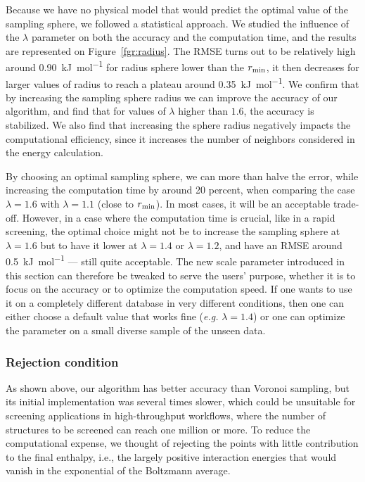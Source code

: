 \documentclass[main]{subfiles}
\begin{document}
Because we have no physical model that would predict the optimal value of the sampling sphere, we followed a statistical approach. We studied the influence of the $\lambda$ parameter on both the accuracy and the computation time, and the results are represented on Figure~\ref{fgr:radius}. The RMSE turns out to be relatively high around \SI{0.90}{\kilo\joule\per\mole} for radius sphere lower than the $r_{\text{min}}$, it then decreases for larger values of radius to reach a plateau around \SI{0.35}{\kilo\joule\per\mole}. We confirm that by increasing the sampling sphere radius we can improve the accuracy of our algorithm, and find that for values of $\lambda$ higher than $1.6$, the accuracy is stabilized. We also find that increasing the sphere radius negatively impacts the computational efficiency, since it increases the number of neighbors considered in the energy calculation.

By choosing an optimal sampling sphere, we can more than halve the error, while increasing the computation time by around 20 percent, when comparing the case $\lambda=1.6$ with $\lambda=1.1$ (close to $r_{\text{min}}$). In most cases, it will be an acceptable trade-off. However, in a case where the computation time is crucial, like in a rapid screening, the optimal choice might not be to increase the sampling sphere at $\lambda=1.6$ but to have it lower at $\lambda=1.4$ or $\lambda=1.2$, and have an RMSE around \SI{0.5}{\kilo\joule\per\mole} --- still quite acceptable. The new scale parameter introduced in this section can therefore be tweaked to serve the users' purpose, whether it is to focus on the accuracy or to optimize the computation speed. {If one wants to use it on a completely different database in very different conditions, then one can either choose a default value that works fine (\emph{e.g.} $\lambda=1.4$) or one can optimize the parameter on a small diverse sample of the unseen data. }

\subsubsection{Rejection condition}

As shown above, our algorithm has better accuracy than Voronoi sampling, but its initial implementation was several times slower, which could be unsuitable for screening applications in high-throughput workflows, where the number of structures to be screened can reach one million or more. To reduce the computational expense, we thought of rejecting the points with little contribution to the final enthalpy, i.e., the largely positive interaction energies that would vanish in the exponential of the  Boltzmann average.
\end{document}
